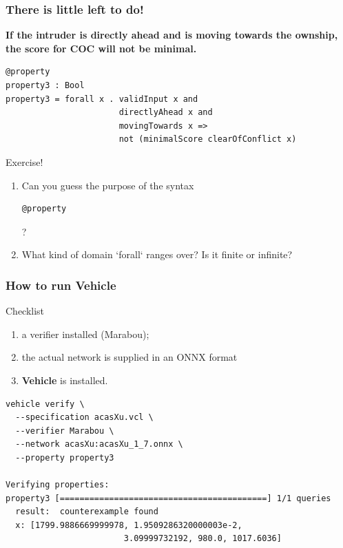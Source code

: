 \documentclass[t,compress,aspectratio=169]{beamer}
\begin{document}
\begin{frame}[fragile]
\frametitle{There is little left to do!}

\footnotesize{
\textbf{If the intruder is directly ahead and is moving towards the
 ownship, the score for COC will not be minimal.}}

\pause

\begin{verbatim}
@property
property3 : Bool
property3 = forall x . validInput x and
                       directlyAhead x and
                       movingTowards x =>
                       not (minimalScore clearOfConflict x)
\end{verbatim}
\pause
\begin{block}{Exercise!}
\footnotesize{
\begin{enumerate}
\item Can you guess the purpose of the syntax
\begin{verbatim}
@property
\end{verbatim}
?
\item What kind of domain  `forall` ranges over? Is it finite or infinite?
\end{enumerate}}
\end{block}

\end{frame}



\begin{frame}[fragile]
\frametitle{How to run Vehicle}
\vspace{-2em}
\begin{block}{Checklist}
\begin{enumerate}
\item a verifier installed (Marabou);
\item the actual network is supplied in an ONNX format
\item \textbf{Vehicle} is installed.
\end{enumerate}
\end{block}

\pause
\begin{verbatim}
vehicle verify \
  --specification acasXu.vcl \
  --verifier Marabou \
  --network acasXu:acasXu_1_7.onnx \
  --property property3

Verifying properties:
property3 [==========================================] 1/1 queries
  result:  counterexample found
  x: [1799.9886669999978, 1.9509286320000003e-2,
                        3.09999732192, 980.0, 1017.6036]
\end{verbatim}
\end{frame}
\end{document}
